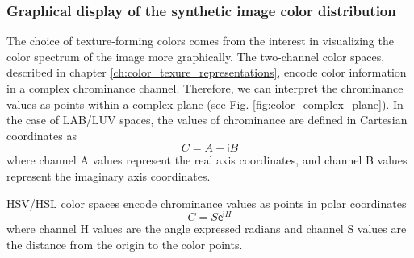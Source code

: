 
\subsubsection{Graphical display of the synthetic image color distribution}
The choice of texture-forming colors comes from the interest in visualizing the color spectrum of the image more graphically. The two-channel color spaces, described in chapter \ref{ch:color_texure_representations}, encode color information in a complex chrominance channel. Therefore, we can interpret the chrominance values as points within a complex plane (see Fig. \ref{fig:color_complex_plane}). In the case of LAB/LUV spaces, the values of chrominance are defined in Cartesian coordinates as 
\begin{equation}\label{eq:chrominance_lab2}
    C = A + \mathsf{i}B
\end{equation}
where channel A values represent the real axis coordinates, and channel B values represent the imaginary axis coordinates. 

HSV/HSL color spaces encode chrominance values as points in polar coordinates 
\begin{equation}\label{eq:chrominance_hsv2}
    C = S \mathsf{e}^{\mathsf{i}H}
\end{equation}
where channel H values are the angle expressed radians and channel S values are the distance from the origin to the color points.

